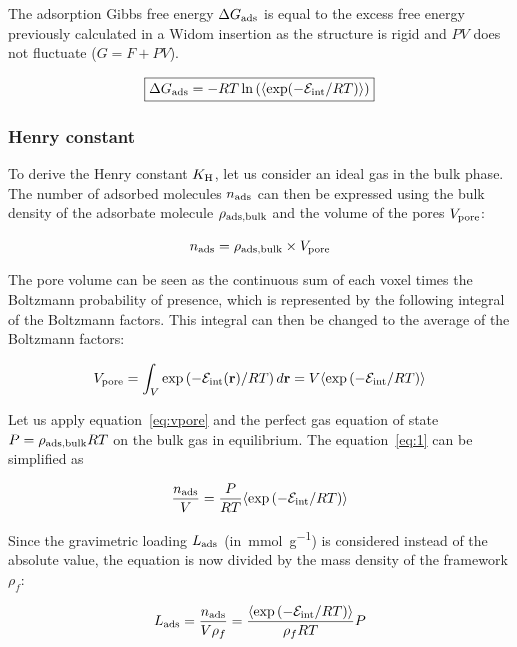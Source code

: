 \documentclass[main.tex]{subfiles}
\begin{document}
The adsorption Gibbs free energy $\Delta G_{\text{ads}}$ is equal to the excess free energy previously calculated in a Widom insertion as the structure is rigid and $PV$ does not fluctuate ($G = F + PV$). 

\begin{equation}\label{eq:ads_gibbs}
  \boxed{
  \Delta G_{\text{ads}} = -RT \ln\left(\langle \exp(-\mathcal{E}_{\text{int}}/RT) \rangle\right)
  }
\end{equation}

\subsubsection{Henry constant}

To derive the Henry constant $K_{\text{H}}$, let us consider an ideal gas in the bulk phase. The number of adsorbed molecules $n_{\text{ads}}$ can then be expressed using the bulk density of the adsorbate molecule $\rho_{\text{ads,bulk}}$ and the volume of the pores $V_{\text{pore}}$:

\begin{equation}\label{eq:1}
    n_{\text{ads}} = \rho_{\text{ads,bulk}} \times V_{\text{pore}}  
\end{equation}

The pore volume can be seen as the continuous sum of each voxel times the Boltzmann probability of presence, which is represented by the following integral of the Boltzmann factors. This integral can then be changed to the average of the Boltzmann factors:

\begin{equation}\label{eq:vpore}
    V_{\text{pore}} = \int_V \exp\left(- \mathcal{E}_{\text{int}}(\textbf{r})/RT\right) d\textbf{r} = V \langle \exp\left(-\mathcal{E}_{\text{int}}/RT\right) \rangle
\end{equation}

Let us apply equation~\ref{eq:vpore} and the perfect gas equation of state $P = \rho_{\text{ads,bulk}}RT$ on the bulk gas in equilibrium. The equation~\ref{eq:1} can be simplified as

\begin{equation}
    \dfrac{n_{\text{ads}}}{V} = \dfrac{P}{RT} \langle \exp\left(-\mathcal{E}_{\text{int}}/RT\right) \rangle
\end{equation}

Since the gravimetric loading $L_{\text{ads}}$ (in~\si{\milli\mole\per\gram}) is considered instead of the absolute value, the equation is now divided by the mass density of the framework $\rho_f$:

\begin{equation}
  L_{\text{ads}} = \dfrac{n_{\text{ads}}}{V\rho_f} = \dfrac{\langle \exp\left(-\mathcal{E}_{\text{int}}/RT\right) \rangle}{\rho_f RT} P
\end{equation}
\end{document}
